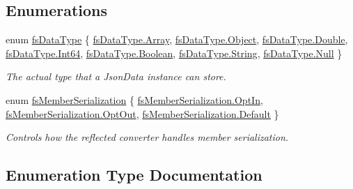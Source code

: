 \subsection*{Enumerations}
\begin{DoxyCompactItemize}
\item 
enum \hyperlink{namespace_full_serializer_a6eee33d63b94e40fdfcfc59af9fcfc82}{fs\+Data\+Type} \{ \newline
\hyperlink{namespace_full_serializer_a6eee33d63b94e40fdfcfc59af9fcfc82a4410ec34d9e6c1a68100ca0ce033fb17}{fs\+Data\+Type.\+Array}, 
\hyperlink{namespace_full_serializer_a6eee33d63b94e40fdfcfc59af9fcfc82a497031794414a552435f90151ac3b54b}{fs\+Data\+Type.\+Object}, 
\hyperlink{namespace_full_serializer_a6eee33d63b94e40fdfcfc59af9fcfc82ad909d38d705ce75386dd86e611a82f5b}{fs\+Data\+Type.\+Double}, 
\hyperlink{namespace_full_serializer_a6eee33d63b94e40fdfcfc59af9fcfc82afbde23b11d7e59af7828e81144c8b487}{fs\+Data\+Type.\+Int64}, 
\newline
\hyperlink{namespace_full_serializer_a6eee33d63b94e40fdfcfc59af9fcfc82a27226c864bac7454a8504f8edb15d95b}{fs\+Data\+Type.\+Boolean}, 
\hyperlink{namespace_full_serializer_a6eee33d63b94e40fdfcfc59af9fcfc82a27118326006d3829667a400ad23d5d98}{fs\+Data\+Type.\+String}, 
\hyperlink{namespace_full_serializer_a6eee33d63b94e40fdfcfc59af9fcfc82abbb93ef26e3c101ff11cdd21cab08a94}{fs\+Data\+Type.\+Null}
 \}\begin{DoxyCompactList}\small\item\em The actual type that a Json\+Data instance can store. \end{DoxyCompactList}
\item 
enum \hyperlink{namespace_full_serializer_ad0dc98cd54a3d07f8c579d82585906f8}{fs\+Member\+Serialization} \{ \hyperlink{namespace_full_serializer_ad0dc98cd54a3d07f8c579d82585906f8aea85bf11bf435701420717c07f3fbb6d}{fs\+Member\+Serialization.\+Opt\+In}, 
\hyperlink{namespace_full_serializer_ad0dc98cd54a3d07f8c579d82585906f8a416ca54b14eaffaf58722fc0441a0f2a}{fs\+Member\+Serialization.\+Opt\+Out}, 
\hyperlink{namespace_full_serializer_ad0dc98cd54a3d07f8c579d82585906f8a7a1920d61156abc05a60135aefe8bc67}{fs\+Member\+Serialization.\+Default}
 \}\begin{DoxyCompactList}\small\item\em Controls how the reflected converter handles member serialization. \end{DoxyCompactList}
\end{DoxyCompactItemize}


\subsection{Enumeration Type Documentation}
\mbox{\label{namespace_full_serializer_a6eee33d63b94e40fdfcfc59af9fcfc82}} 
